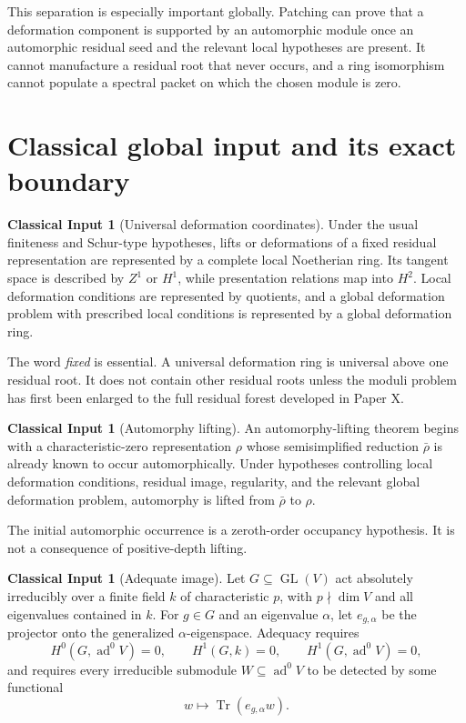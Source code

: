\documentclass[11pt]{article}
\theoremstyle{definition}
\newtheorem{classicalinput}[theorem]{Classical Input}
\theoremstyle{remark}
\newcommand{\GL}{\operatorname{GL}}
\newcommand{\Tr}{\operatorname{Tr}}
\newcommand{\ad}{\operatorname{ad}}
\begin{document}
This separation is especially important globally.  Patching can prove that a deformation component is supported by an automorphic module once an automorphic residual seed and the relevant local hypotheses are present.  It cannot manufacture a residual root that never occurs, and a ring isomorphism cannot populate a spectral packet on which the chosen module is zero.

\section{Classical global input and its exact boundary}

\begin{classicalinput}[Universal deformation coordinates]
Under the usual finiteness and Schur-type hypotheses, lifts or deformations of a fixed residual representation are represented by a complete local Noetherian ring.  Its tangent space is described by $Z^1$ or $H^1$, while presentation relations map into $H^2$.  Local deformation conditions are represented by quotients, and a global deformation problem with prescribed local conditions is represented by a global deformation ring.
\end{classicalinput}

The word \emph{fixed} is essential.  A universal deformation ring is universal above one residual root.  It does not contain other residual roots unless the moduli problem has first been enlarged to the full residual forest developed in Paper X.

\begin{classicalinput}[Automorphy lifting]
An automorphy-lifting theorem begins with a characteristic-zero representation $\rho$ whose semisimplified reduction $\bar\rho$ is already known to occur automorphically.  Under hypotheses controlling local deformation conditions, residual image, regularity, and the relevant global deformation problem, automorphy is lifted from $\bar\rho$ to $\rho$.
\end{classicalinput}

The initial automorphic occurrence is a zeroth-order occupancy hypothesis.  It is not a consequence of positive-depth lifting.

\begin{classicalinput}[Adequate image]
Let $G\subseteq\GL(V)$ act absolutely irreducibly over a finite field $k$ of characteristic $p$, with $p\nmid\dim V$ and all eigenvalues contained in $k$.  For $g\in G$ and an eigenvalue $\alpha$, let $e_{g,\alpha}$ be the projector onto the generalized $\alpha$-eigenspace.  Adequacy requires
\[
H^0(G,\ad^0V)=0,
\qquad
H^1(G,k)=0,
\qquad
H^1(G,\ad^0V)=0,
\]
and requires every irreducible submodule $W\subseteq\ad^0V$ to be detected by some functional
\[
w\longmapsto\Tr(e_{g,\alpha}w).
\]
\end{classicalinput}
\end{document}
